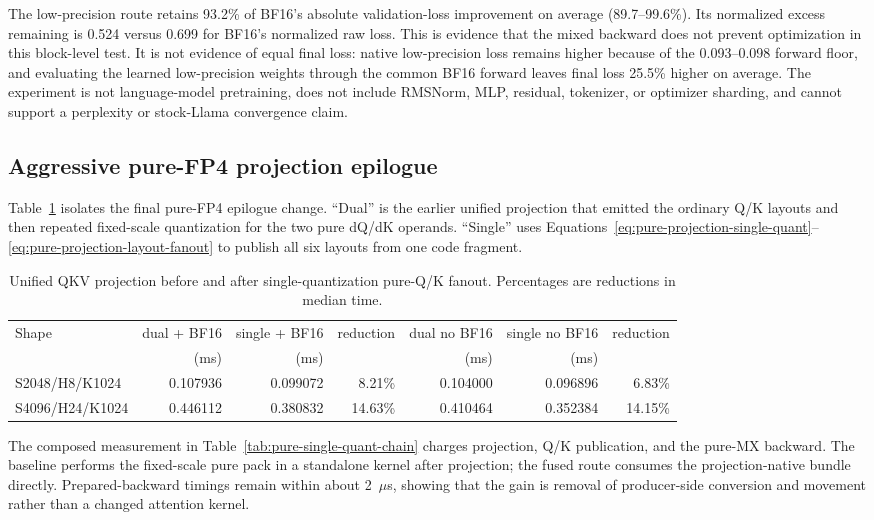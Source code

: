 The low-precision route retains 93.2\% of BF16's absolute validation-loss
improvement on average (89.7--99.6\%).  Its normalized excess remaining is
0.524 versus 0.699 for BF16's normalized raw loss.  This is evidence that the
mixed backward does not prevent optimization in this block-level test.  It is
not evidence of equal final loss: native low-precision loss remains higher
because of the 0.093--0.098 forward floor, and evaluating the learned
low-precision weights through the common BF16 forward leaves final loss
25.5\% higher on average.  The experiment is not language-model pretraining,
does not include RMSNorm, MLP, residual, tokenizer, or optimizer sharding, and
cannot support a perplexity or stock-Llama convergence claim.

\subsection{Aggressive pure-FP4 projection epilogue}

Table~\ref{tab:pure-single-quant-projection} isolates the final pure-FP4
epilogue change.  ``Dual'' is the earlier unified projection that emitted the
ordinary Q/K layouts and then repeated fixed-scale quantization for the two
pure dQ/dK operands.  ``Single'' uses
Equations~\ref{eq:pure-projection-single-quant}--\ref{eq:pure-projection-layout-fanout}
to publish all six layouts from one code fragment.

\begin{table}[htbp]
\centering
\caption{Unified QKV projection before and after single-quantization pure-Q/K
fanout.  Percentages are reductions in median time.}
\label{tab:pure-single-quant-projection}
\scriptsize
\begin{tabular}{l rrr rrr}
\toprule
Shape & dual + BF16 & single + BF16 & reduction & dual no BF16 & single no BF16 & reduction \\
 & (ms) & (ms) & & (ms) & (ms) & \\
\midrule
S2048/H8/K1024  & 0.107936 & 0.099072 & 8.21\%  & 0.104000 & 0.096896 & 6.83\% \\
S4096/H24/K1024 & 0.446112 & 0.380832 & 14.63\% & 0.410464 & 0.352384 & 14.15\% \\
\bottomrule
\end{tabular}
\end{table}

The composed measurement in Table~\ref{tab:pure-single-quant-chain} charges
projection, Q/K publication, and the pure-MX backward.  The baseline performs
the fixed-scale pure pack in a standalone kernel after projection; the fused
route consumes the projection-native bundle directly.  Prepared-backward
timings remain within about 2~$\mu$s, showing that the gain is removal of
producer-side conversion and movement rather than a changed attention
kernel.

